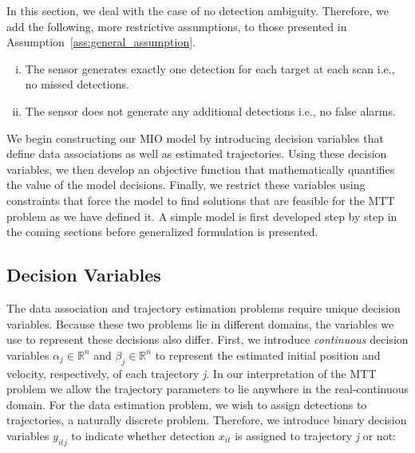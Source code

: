 In this section, we deal with the case of no detection ambiguity. Therefore, we add the following, more restrictive assumptions, to those presented in Assumption~\ref{ass:general_assumption}.

\begin{assumption}\label{ass:basic_assumptions}
\leavevmode
\begin{enumerate}[(i)]
\item The sensor generates exactly one detection for each target
 at each scan i.e., no missed detections.
\item The sensor does not generate any additional detections
i.e., no false alarms.
\end{enumerate}
\end{assumption}


We begin constructing our MIO model by introducing decision variables that define data associations as well as estimated trajectories. Using these decision variables, we then develop an objective function that  mathematically quantifies the value of the model decisions. Finally, we restrict these variables using constraints that force the model to find solutions that are feasible for the MTT problem as we have defined it. A simple model is first developed step by step in the coming sections before generalized formulation is presented. 

\subsection{Decision Variables}
The data association and trajectory estimation problems require unique decision variables. Because these two problems lie in different domains, the variables we use to represent these decisions also differ. First, we introduce \textit{continuous} decision variables $\alpha_{j} \in \mathbb{R}^n$ and $\beta_{j} \in \mathbb{R}^n$ to represent the estimated initial position and velocity, respectively, of each trajectory \textit{j}. In our interpretation of the MTT problem we allow the trajectory parameters to lie anywhere in the real-continuous domain. For the data estimation problem, we wish to assign detections to trajectories, a naturally discrete problem. Therefore, we introduce binary decision variables $y_{itj}$ to indicate whether detection $x_{it}$ is assigned to trajectory \textit{j} or not:

